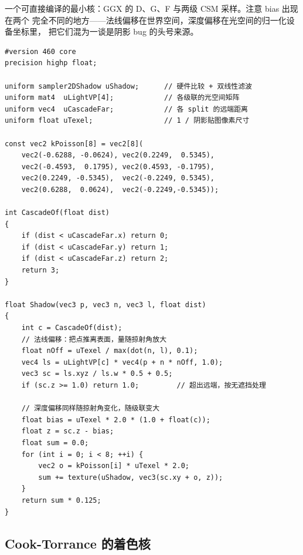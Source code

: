 \documentclass[12pt,a4paper,fontset=fandol]{ctexbook}
\begin{document}
一个可直接编译的最小核：GGX 的 D、G、F 与两级 CSM 采样。注意 bias 出现在两个
完全不同的地方------法线偏移在世界空间，深度偏移在光空间的归一化设备坐标里，
把它们混为一谈是阴影 bug 的头号来源。

\begin{lstlisting}[style=glslstyle,caption={阴影采样：法线偏移、深度偏移与 Poisson 盘 PCF},label={lst:ch12-shadow}]
#version 460 core
precision highp float;

uniform sampler2DShadow uShadow;      // 硬件比较 + 双线性滤波
uniform mat4  uLightVP[4];            // 各级联的光空间矩阵
uniform vec4  uCascadeFar;            // 各 split 的远端距离
uniform float uTexel;                 // 1 / 阴影贴图像素尺寸

const vec2 kPoisson[8] = vec2[8](
    vec2(-0.6288, -0.0624), vec2(0.2249,  0.5345),
    vec2(-0.4593,  0.1795), vec2(0.4593, -0.1795),
    vec2(0.2249, -0.5345),  vec2(-0.2249, 0.5345),
    vec2(0.6288,  0.0624),  vec2(-0.2249,-0.5345));

int CascadeOf(float dist)
{
    if (dist < uCascadeFar.x) return 0;
    if (dist < uCascadeFar.y) return 1;
    if (dist < uCascadeFar.z) return 2;
    return 3;
}

float Shadow(vec3 p, vec3 n, vec3 l, float dist)
{
    int c = CascadeOf(dist);
    // 法线偏移：把点推离表面，量随掠射角放大
    float nOff = uTexel / max(dot(n, l), 0.1);
    vec4 ls = uLightVP[c] * vec4(p + n * nOff, 1.0);
    vec3 sc = ls.xyz / ls.w * 0.5 + 0.5;
    if (sc.z >= 1.0) return 1.0;         // 超出远端，按无遮挡处理

    // 深度偏移同样随掠射角变化，随级联变大
    float bias = uTexel * 2.0 * (1.0 + float(c));
    float z = sc.z - bias;
    float sum = 0.0;
    for (int i = 0; i < 8; ++i) {
        vec2 o = kPoisson[i] * uTexel * 2.0;
        sum += texture(uShadow, vec3(sc.xy + o, z));
    }
    return sum * 0.125;
}
\end{lstlisting}

\subsection{Cook-Torrance 的着色核}
\end{document}
